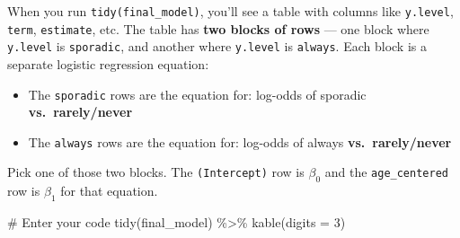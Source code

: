 \documentclass[
  letterpaper,
  DIV=11,
  numbers=noendperiod]{scrartcl}
\newenvironment{Shaded}{\begin{snugshade}}{\end{snugshade}}
\newcommand{\AttributeTok}[1]{\textcolor[rgb]{0.40,0.45,0.13}{#1}}
\newcommand{\CommentTok}[1]{\textcolor[rgb]{0.37,0.37,0.37}{#1}}
\newcommand{\DecValTok}[1]{\textcolor[rgb]{0.68,0.00,0.00}{#1}}
\newcommand{\FunctionTok}[1]{\textcolor[rgb]{0.28,0.35,0.67}{#1}}
\newcommand{\NormalTok}[1]{\textcolor[rgb]{0.00,0.23,0.31}{#1}}
\newcommand{\SpecialCharTok}[1]{\textcolor[rgb]{0.37,0.37,0.37}{#1}}
\providecommand{\tightlist}{%
  \setlength{\itemsep}{0pt}\setlength{\parskip}{0pt}}
\begin{document}
\begin{tcolorbox}[enhanced jigsaw, toprule=.15mm, opacitybacktitle=0.6, coltitle=black, opacityback=0, bottomrule=.15mm, left=2mm, colframe=quarto-callout-tip-color-frame, leftrule=.75mm, toptitle=1mm, colbacktitle=quarto-callout-tip-color!10!white, rightrule=.15mm, colback=white, title=\textcolor{quarto-callout-tip-color}{\faLightbulb}\hspace{0.5em}{Hint: Reading the tidy() output}, arc=.35mm, bottomtitle=1mm, titlerule=0mm, breakable]

When you run \texttt{tidy(final\_model)}, you'll see a table with
columns like \texttt{y.level}, \texttt{term}, \texttt{estimate}, etc.
The table has \textbf{two blocks of rows} --- one block where
\texttt{y.level} is \texttt{sporadic}, and another where
\texttt{y.level} is \texttt{always}. Each block is a separate logistic
regression equation:

\begin{itemize}
\tightlist
\item
  The \texttt{sporadic} rows are the equation for: log-odds of sporadic
  \textbf{vs.~rarely/never}
\item
  The \texttt{always} rows are the equation for: log-odds of always
  \textbf{vs.~rarely/never}
\end{itemize}

Pick one of those two blocks. The \texttt{(Intercept)} row is
\(\beta_0\) and the \texttt{age\_centered} row is \(\beta_1\) for that
equation.

\end{tcolorbox}

\begin{Shaded}
\begin{Highlighting}[]
\CommentTok{\# Enter your code}
\FunctionTok{tidy}\NormalTok{(final\_model) }\SpecialCharTok{\%\textgreater{}\%} \FunctionTok{kable}\NormalTok{(}\AttributeTok{digits =} \DecValTok{3}\NormalTok{)}
\end{Highlighting}
\end{Shaded}
\end{document}
